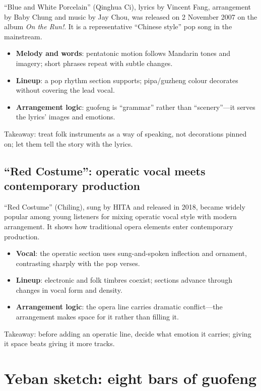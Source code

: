 ``Blue and White Porcelain'' (Qinghua Ci), lyrics by Vincent Fang, arrangement by Baby Chung and music by Jay Chou, was released on 2 November 2007 on the album \emph{On the Run!}. It is a representative ``Chinese style'' pop song in the mainstream.

\begin{itemize}
\item \textbf{Melody and words}: pentatonic motion follows Mandarin tones and imagery; short phrases repeat with subtle changes.
\item \textbf{Lineup}: a pop rhythm section supports; pipa/guzheng colour decorates without covering the lead vocal.
\item \textbf{Arrangement logic}: guofeng is ``grammar'' rather than ``scenery''---it serves the lyrics' images and emotions.
\end{itemize}

Takeaway: treat folk instruments as a way of speaking, not decorations pinned on; let them tell the story with the lyrics.

\subsection{``Red Costume'': operatic vocal meets contemporary production}
\label{sec:guofeng-case-chiling}

``Red Costume'' (Chiling), sung by HITA and released in 2018, became widely popular among young listeners for mixing operatic vocal style with modern arrangement. It shows how traditional opera elements enter contemporary production.

\begin{itemize}
\item \textbf{Vocal}: the operatic section uses sung-and-spoken inflection and ornament, contrasting sharply with the pop verses.
\item \textbf{Lineup}: electronic and folk timbres coexist; sections advance through changes in vocal form and density.
\item \textbf{Arrangement logic}: the opera line carries dramatic conflict---the arrangement makes space for it rather than filling it.
\end{itemize}

Takeaway: before adding an operatic line, decide what emotion it carries; giving it space beats giving it more tracks.

\section{Yeban sketch: eight bars of guofeng}
\label{sec:guofeng-yeban}

